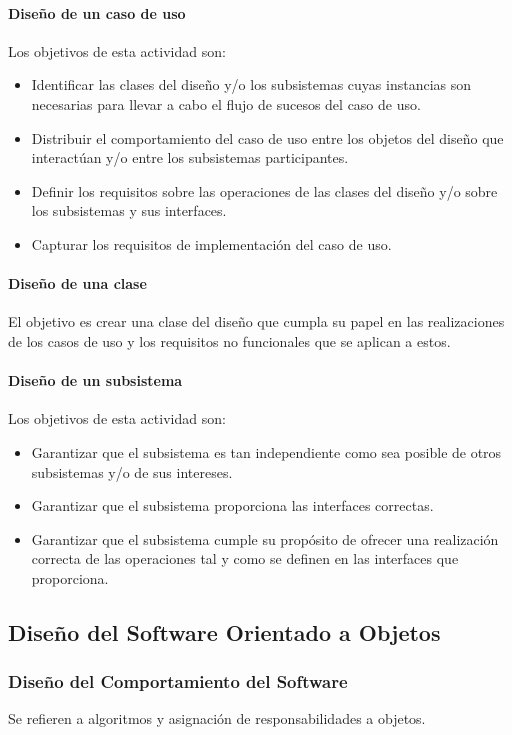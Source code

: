 \paragraph{Diseño de un caso de uso}
Los objetivos de esta actividad son:
\begin{itemize}
	\item Identificar las clases del diseño y/o los subsistemas cuyas instancias son necesarias para llevar a cabo el flujo de sucesos del caso de uso.
	\item Distribuir el comportamiento del caso de uso entre los objetos del diseño que interactúan y/o entre los subsistemas participantes.
	\item Definir los requisitos sobre las operaciones de las clases del diseño y/o sobre los subsistemas y sus interfaces.
	\item Capturar los requisitos de implementación del caso de uso.
\end{itemize}
\paragraph{Diseño de una clase}
El objetivo es crear una clase del diseño que cumpla su papel en las realizaciones de los casos de uso y los requisitos no funcionales que se aplican a estos.
\paragraph{Diseño de un subsistema}
Los objetivos de esta actividad son:
\begin{itemize}
	\item Garantizar que el subsistema es tan independiente como sea posible de otros subsistemas y/o de sus intereses.
	\item Garantizar que el subsistema proporciona las interfaces correctas.
	\item Garantizar que el subsistema cumple su propósito de ofrecer una realización correcta de las operaciones tal y como se definen en las interfaces que proporciona.
\end{itemize}
\subsection{Diseño del Software Orientado a Objetos}
\subsubsection{Diseño del Comportamiento del Software}
Se refieren a algoritmos y asignación de responsabilidades a objetos.
